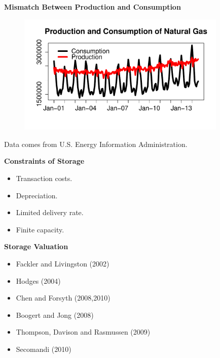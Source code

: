 \documentclass{beamer}
\begin{document}
\begin{frame}
{\bf Mismatch Between Production and Consumption}
\begin{figure}[hbt]
  \includegraphics[width = 10cm]{DemandSupply.pdf}
\end{figure}
\begin{center}
Data comes from U.S. Energy Information Administration.
\end{center}
\end{frame}

\begin{frame}
{\bf Constraints of Storage}

\begin{itemize}
  \item Transaction costs.
  \item Depreciation.
  \item Limited delivery rate.
  \item Finite capacity.
\end{itemize}

\end{frame}




\begin{frame}
{\bf Storage Valuation}
\begin{itemize}
   \item Fackler and Livingston (2002)
  \item Hodges (2004)
  \item Chen and Forsyth (2008,2010)
  \item Boogert and Jong (2008)
  \item Thompson, Davison and Rasmussen (2009)
  \item Secomandi (2010)
\end{itemize}
\end{frame}
\end{document}
